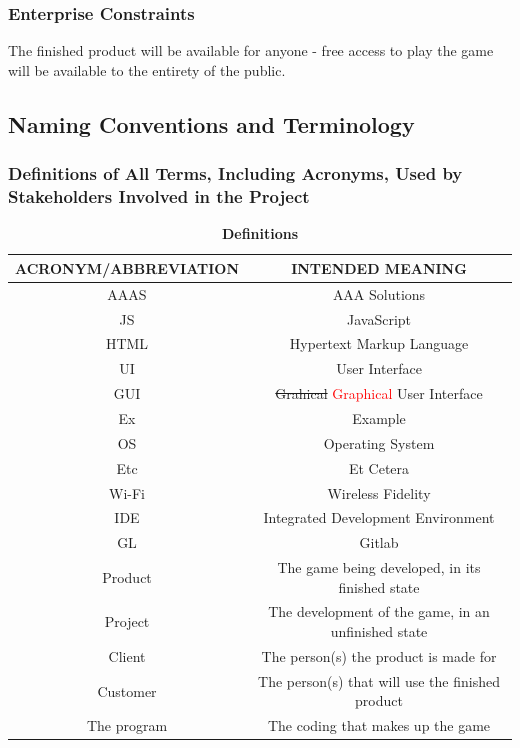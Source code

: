 \documentclass[12pt, titlepage]{article}
\begin{document}
\subsubsection{Enterprise Constraints}

The finished product will be available for anyone - free access to play the game will be available to the entirety of the public.

\subsection{Naming Conventions and Terminology}

\subsubsection{Definitions of All Terms, Including Acronyms, Used by Stakeholders Involved in the Project}
\begin{table}[H]
\caption{\bf Definitions}
\begin{center}
\begin{tabular}{|c|c|}
\hline
ACRONYM/ABBREVIATION & INTENDED MEANING\\
\hline
AAAS & AAA Solutions\\
\hline
JS & JavaScript\\
\hline
HTML &Hypertext Markup Language\\
\hline
UI & User Interface\\
\hline
GUI & \sout{Grahical} \textcolor{red}{Graphical} User Interface\\
\hline
Ex & Example\\
\hline
OS & Operating System\\
\hline
Etc & Et Cetera\\
\hline
Wi-Fi & Wireless Fidelity\\
\hline
IDE & Integrated Development Environment\\
\hline
GL & Gitlab\\
\hline
Product & The game being developed, in its finished state\\
\hline
Project & The development of the game, in an unfinished state\\
\hline
Client & The person(s) the product is made for\\
\hline
Customer & The person(s) that will use the finished product\\
\hline
The program & The coding that makes up the game\\
\hline
\end{tabular}
\end{center}
\label{default}
\end{table}%
\end{document}
